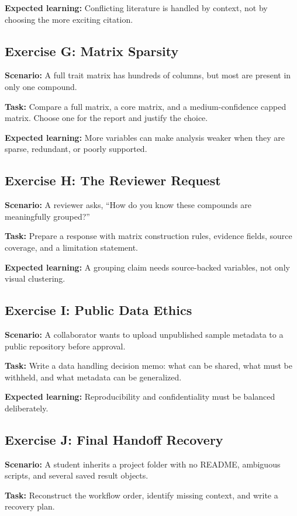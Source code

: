 \textbf{Expected learning:} Conflicting literature is handled by context, not by choosing the more exciting citation.

\subsection{Exercise G: Matrix Sparsity}
\textbf{Scenario:} A full trait matrix has hundreds of columns, but most are present in only one compound.

\textbf{Task:} Compare a full matrix, a core matrix, and a medium-confidence capped matrix. Choose one for the report and justify the choice.

\textbf{Expected learning:} More variables can make analysis weaker when they are sparse, redundant, or poorly supported.

\subsection{Exercise H: The Reviewer Request}
\textbf{Scenario:} A reviewer asks, ``How do you know these compounds are meaningfully grouped?''

\textbf{Task:} Prepare a response with matrix construction rules, evidence fields, source coverage, and a limitation statement.

\textbf{Expected learning:} A grouping claim needs source-backed variables, not only visual clustering.

\subsection{Exercise I: Public Data Ethics}
\textbf{Scenario:} A collaborator wants to upload unpublished sample metadata to a public repository before approval.

\textbf{Task:} Write a data handling decision memo: what can be shared, what must be withheld, and what metadata can be generalized.

\textbf{Expected learning:} Reproducibility and confidentiality must be balanced deliberately.

\subsection{Exercise J: Final Handoff Recovery}
\textbf{Scenario:} A student inherits a project folder with no README, ambiguous scripts, and several saved result objects.

\textbf{Task:} Reconstruct the workflow order, identify missing context, and write a recovery plan.

